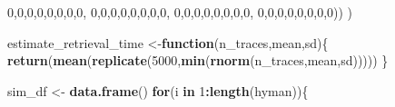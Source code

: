 \documentclass[,man,floatsintext]{apa6}
\newenvironment{Shaded}{\begin{snugshade}}{\end{snugshade}}
\newcommand{\ControlFlowTok}[1]{\textcolor[rgb]{0.13,0.29,0.53}{\textbf{#1}}}
\newcommand{\DecValTok}[1]{\textcolor[rgb]{0.00,0.00,0.81}{#1}}
\newcommand{\KeywordTok}[1]{\textcolor[rgb]{0.13,0.29,0.53}{\textbf{#1}}}
\newcommand{\NormalTok}[1]{#1}
\newcommand{\OperatorTok}[1]{\textcolor[rgb]{0.81,0.36,0.00}{\textbf{#1}}}
\newcommand{\StringTok}[1]{\textcolor[rgb]{0.31,0.60,0.02}{#1}}
\begin{document}
\begin{Shaded}
\begin{Highlighting}[]
                         \DecValTok{0}\NormalTok{,}\DecValTok{0}\NormalTok{,}\DecValTok{0}\NormalTok{,}\DecValTok{0}\NormalTok{,}\DecValTok{0}\NormalTok{,}\DecValTok{0}\NormalTok{,}\DecValTok{0}\NormalTok{,}\DecValTok{0}\NormalTok{,}
                         \DecValTok{0}\NormalTok{,}\DecValTok{0}\NormalTok{,}\DecValTok{0}\NormalTok{,}\DecValTok{0}\NormalTok{,}\DecValTok{0}\NormalTok{,}\DecValTok{0}\NormalTok{,}\DecValTok{0}\NormalTok{,}\DecValTok{0}\NormalTok{,}
                         \DecValTok{0}\NormalTok{,}\DecValTok{0}\NormalTok{,}\DecValTok{0}\NormalTok{,}\DecValTok{0}\NormalTok{,}\DecValTok{0}\NormalTok{,}\DecValTok{0}\NormalTok{,}\DecValTok{0}\NormalTok{,}\DecValTok{0}\NormalTok{,}
                         \DecValTok{0}\NormalTok{,}\DecValTok{0}\NormalTok{,}\DecValTok{0}\NormalTok{,}\DecValTok{0}\NormalTok{,}\DecValTok{0}\NormalTok{,}\DecValTok{0}\NormalTok{,}\DecValTok{0}\NormalTok{,}\DecValTok{0}\NormalTok{))}
\NormalTok{)}

\NormalTok{estimate_retrieval_time <-}\ControlFlowTok{function}\NormalTok{(n_traces,mean,sd)\{}
  \KeywordTok{return}\NormalTok{(}\KeywordTok{mean}\NormalTok{(}\KeywordTok{replicate}\NormalTok{(}\DecValTok{5000}\NormalTok{,}\KeywordTok{min}\NormalTok{(}\KeywordTok{rnorm}\NormalTok{(n_traces,mean,sd)))))}
\NormalTok{\}}

\NormalTok{sim_df <-}\StringTok{ }\KeywordTok{data.frame}\NormalTok{()}
\ControlFlowTok{for}\NormalTok{(i }\ControlFlowTok{in} \DecValTok{1}\OperatorTok{:}\KeywordTok{length}\NormalTok{(hyman))\{}


\end{Highlighting}
\end{Shaded}
\end{document}
